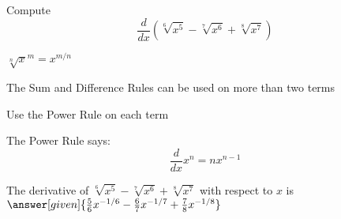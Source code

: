\documentclass{ximera}
\begin{document}
\begin{problem} %
  Compute 
  \[
  \frac{d}{dx} (\sqrt[6] {x^5} - \sqrt[7] {x^6} + \sqrt[8] {x^7})
  \]
  
    \begin{hint}
		 $\sqrt[n] x^m = x^{m/n}$
		\end{hint}
		\begin{hint}
		  The Sum and Difference Rules can be used on more than two terms
		\end{hint}
		\begin{hint}
      Use the Power Rule on each term
    \end{hint}
    \begin{hint}
      The Power Rule says:
      \[
      \frac{d}{dx} x^n = nx^{n-1}
      \]
    \end{hint}    
		The derivative of $\sqrt[6] {x^5} - \sqrt[7] {x^6} + \sqrt[8] {x^7}$ with respect to $x$ is
		 $\answer[given]{\frac56 x^{-1/6} - \frac67 x^{-1/7} + \frac78 x^{-1/8}}$
	
\end{problem}
\end{document}
